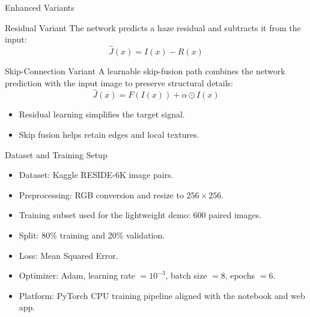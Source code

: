\documentclass[aspectratio=169]{beamer}
\begin{document}
\begin{frame}{Enhanced Variants}
  \begin{block}{Residual Variant}
    The network predicts a haze residual and subtracts it from the input:
    \[
      \hat{J}(x) = I(x) - R(x)
    \]
  \end{block}

  \begin{block}{Skip-Connection Variant}
    A learnable skip-fusion path combines the network prediction with the input image to preserve structural details:
    \[
      \hat{J}(x) = F(I(x)) + \alpha \odot I(x)
    \]
  \end{block}

  \begin{itemize}
    \item Residual learning simplifies the target signal.
    \item Skip fusion helps retain edges and local textures.
  \end{itemize}
\end{frame}

\begin{frame}{Dataset and Training Setup}
  \begin{itemize}
    \item Dataset: Kaggle RESIDE-6K image pairs.
    \item Preprocessing: RGB conversion and resize to \(256 \times 256\).
    \item Training subset used for the lightweight demo: 600 paired images.
    \item Split: 80\% training and 20\% validation.
    \item Loss: Mean Squared Error.
    \item Optimizer: Adam, learning rate \(= 10^{-3}\), batch size \(= 8\), epochs \(= 6\).
    \item Platform: PyTorch CPU training pipeline aligned with the notebook and web app.
  \end{itemize}
\end{frame}
\end{document}
